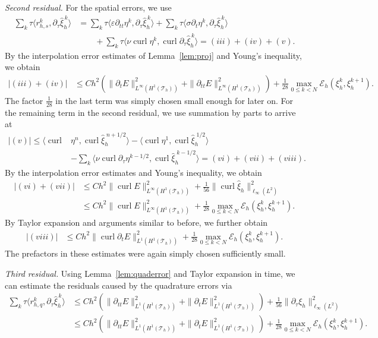 \documentclass[12pt,reqno,a4paper]{amsart}
\theoremstyle{definition}
\def\Th{\mathcal{T}_h}
\def\EE{\mathscr{E}}
\def\dtau{\partial_{\tau}}
\def\dt{\partial_{t}}
\def\dtt{\partial_{tt}}
\def\curl{\operatorname{curl}}
\def\Th{\mathcal{T}_h}
\def\E{{E}}
\def\r{{r}}
\def\wh{\widehat}
\def\la{\langle}
\def\ra{\rangle}
\begin{document}
\medskip 
\noindent 
\textit{Second residual.}
For the spatial errors, we use
\begin{align*}
\sum\nolimits_k\tau\la\r_{h,s}^k,\dtau\wh\xi_h^{\,k}\ra
&= \sum\nolimits_k \tau\la\varepsilon\dtt \eta^k,\dtau\wh\xi_h^{\,k}\ra + \sum\nolimits_k \tau \la\sigma\dt\eta^k,\dtau\wh\xi_h^{\,k}\ra  \\
&\qquad + \sum\nolimits_k \tau\la\nu\curl\eta^k,\curl\dtau\wh\xi_h^{\,k}\ra = (iii) + (iv) + (v).
\end{align*}
By the interpolation error estimates of Lemma~\ref{lem:proj} and Young's inequality, we obtain
\begin{align*}
|(iii)+(iv)| 
&\le C h^2 (\|\dt E\|^2_{L^\infty(H^1(\Th))} + \|\dtt E\|^2_{L^\infty(H^1(\Th))}) 
+\tfrac{1}{28}\max_{0\le k<N} \EE_h(\xi_h^k,\xi_h^{k+1}).
\end{align*}
The factor $\tfrac{1}{28}$ in the last term was simply chosen small enough for later on. 
For the remaining term in the second residual, we use summation by parts to arrive at 
\begin{align*}
|(v)| \le \la\curl&\eta^n,\curl\wh\xi_h^{\;n+1/2}\ra -\la\curl\eta^1,\curl\wh\xi_h^{\;1/2}\ra \\
&-\sum\nolimits_k \la\nu\curl\dtau\eta^{k-1/2},\curl\wh\xi_h^{\;k-1/2}\ra
=(vi) + (vii) + (viii).
\end{align*}
By the interpolation error estimates and Young's inequality, we obtain 
\begin{align*}
|(vi) + (vii)|
&\le C h^2 \|\curl\E\|^2_{L^\infty(H^1(\Th))} + \tfrac{1}{56}\|\curl\wh\xi_h\|^2_{\ell_\infty(L^2)}\\
&\le C h^2 \|\curl\E\|^2_{L^\infty(H^1(\Th))} + \tfrac{1}{28}\max_{0\le k<N} \EE_h(\xi_h^k,\xi_h^{k+1}).
\end{align*}
By Taylor expansion and arguments similar to before, we further obtain
\begin{align*}
|(viii)|&\le C h^{2} \|\curl\dt E\|_{L^1(H^1(\Th))}^2 + \tfrac{1}{28}\max_{0\le k<N} \EE_h(\xi_h^k,\xi_h^{k+1}).
\end{align*}
The prefactors in these estimates were again simply chosen sufficiently small.

\medskip 
\noindent 
\textit{Third residual.}
Using Lemma~\ref{lem:quaderror} and Taylor expansion in time, we can estimate the residuals caused by the quadrature errors via
\begin{align*}
\sum\nolimits_k\tau\la\r_{h,q}^k,\dtau\wh\xi_h^{\,k}\ra
&\le  C h^2 (\|\dtt E\|^2_{L^1(H^1(\Th))} + \|\dt E\|^2_{L^1(H^1(\Th))}) + \tfrac{1}{56} \|\dtau\xi_h\|^2_{\ell_\infty(L^2)}\\
&\le  C h^2 (\|\dtt E\|^2_{L^1(H^1(\Th))} + \|\dt E\|^2_{L^1(H^1(\Th))}) + \tfrac{1}{28} \max_{0\le k<N} \EE_h(\xi_h^k,\xi_h^{k+1}).
\end{align*}
\end{document}
